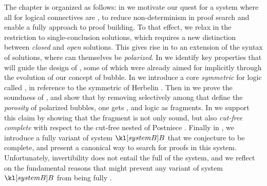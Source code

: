 The chapter is organized as follows: in  we motivate our
quest for a system where all  for logical connectives are
\emph{}, to reduce non-determinism in proof search and enable a fully
\emph{} approach to proof building. To that effect, we relax in
 the restriction to single-conclusion solutions, which
requires a new distinction between \emph{closed} and \emph{open} solutions. This
gives rise in  to an extension of the syntax of solutions, where
 can themselves be \emph{polarized}. In  we identify
key properties that will guide the design of , some of which were
already aimed for implicitly through the evolution of our concept of bubble. In
 we introduce a core \emph{symmetric }
for  logic called , in reference to the symmetric
 of Herbelin . Then in
 we prove the soundness of , and show
that by removing selectively among  that define the
\emph{porosity} of polarized bubbles, one gets ,
 and  logic as fragments. In
 we support this claim by showing that the
 fragment is not only sound, but also \emph{cut-free complete}
with respect to the cut-free nested   of Postniece
\cite{postniece_deep_2009}. Finally in , we
introduce a fully  variant of system $\sysB$ that we conjecture to be
complete, and present a canonical way to search for proofs in this system.
Unfortunately, invertibility does not entail the full  of the system,
and we reflect on the fundamental reasons that might prevent any variant of
system $\sysB$ from being fully .


